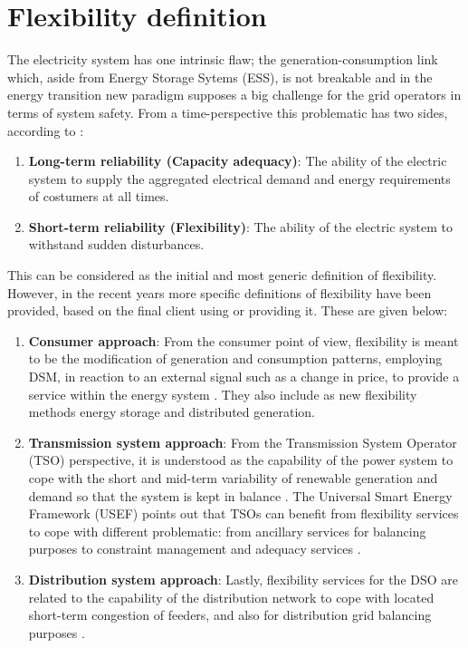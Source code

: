 \section{Flexibility definition}
The electricity system has one intrinsic flaw; the generation-consumption link which, aside from Energy Storage Sytems (ESS), is not breakable and in the energy transition new paradigm supposes a big challenge for the grid operators in terms of system safety. From a time-perspective this problematic has two sides, according to \cite{FINON2008143}:

\begin{enumerate}
\item \textbf{Long-term reliability (Capacity adequacy)}: The ability of the electric system to supply the aggregated electrical demand and energy requirements of costumers at all times.  \cite{FINON2008143}
\item \textbf{Short-term reliability (Flexibility)}: The ability of the electric system to withstand sudden disturbances.
\end{enumerate}

This can be considered as the initial and most generic definition of flexibility. However, in the recent years more specific definitions of flexibility have been provided, based on the final client using or providing it. These are given below:

\begin{enumerate}
\item \textbf{Consumer approach}: From the consumer point of view, flexibility is meant to be the modification of generation and consumption patterns, employing DSM, in reaction to an external signal such as a change in price, to provide a service within the energy system \cite{OfficeofGasandElectricityMarketsOfgem2015}. They also include as new flexibility methods energy storage and distributed generation.
\item \textbf{Transmission system approach}: From the Transmission System Operator (TSO) perspective, it is understood as the capability of the power system to cope with the short and mid-term variability of renewable generation and demand so that the system is kept in balance \cite{Profumo2016, EuropeanNetworkofTransmissionSystemOperatorsforElectricityENTSO}.
The Universal Smart Energy Framework (USEF) points out that TSOs can benefit from flexibility services to cope with different problematic: from ancillary services for balancing purposes to constraint management and adequacy services \cite{USEF2018}.
\item \textbf{Distribution system approach}: Lastly, flexibility services for the DSO are related to the capability of the distribution network to cope with located short-term congestion of feeders, and also for distribution grid balancing purposes \cite{Minniti_2018, Khatami2018}. 
\end{enumerate}

